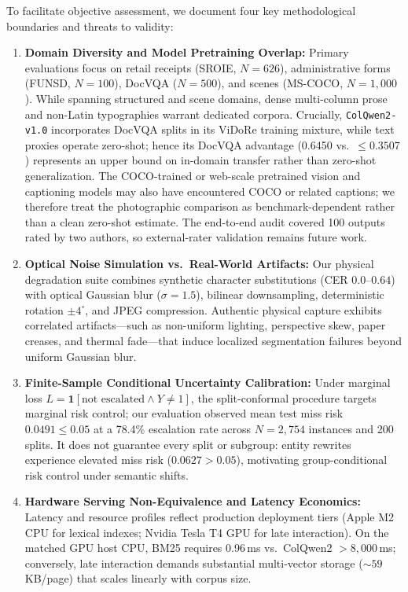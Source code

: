 To facilitate objective assessment, we document four key methodological boundaries and threats to validity:
\begin{enumerate}
    \setlength{\itemsep}{0.2pt plus 0.1pt}
    \setlength{\parskip}{0pt}
    \item \textbf{Domain Diversity and Model Pretraining Overlap:} Primary evaluations focus on retail receipts (SROIE, $N=626$), administrative forms (FUNSD, $N=100$), DocVQA ($N=500$), and scenes (MS-COCO, $N=1{,}000$). While spanning structured and scene domains, dense multi-column prose and non-Latin typographies warrant dedicated corpora. Crucially, \texttt{ColQwen2-v1.0} \cite{faysse2024colqwen2} incorporates DocVQA splits in its ViDoRe training mixture, while text proxies operate zero-shot; hence its DocVQA advantage (0.6450 vs.\ $\le 0.3507$) represents an upper bound on in-domain transfer rather than zero-shot generalization. The COCO-trained or web-scale pretrained vision and captioning models may also have encountered COCO or related captions; we therefore treat the photographic comparison as benchmark-dependent rather than a clean zero-shot estimate. The end-to-end audit covered 100 outputs rated by two authors, so external-rater validation remains future work.
    \item \textbf{Optical Noise Simulation vs.\ Real-World Artifacts:} Our physical degradation suite combines synthetic character substitutions (CER $0.0$--$0.64$) with optical Gaussian blur ($\sigma=1.5$), bilinear downsampling, deterministic rotation $\pm4^\circ$, and JPEG compression. Authentic physical capture exhibits correlated artifacts---such as non-uniform lighting, perspective skew, paper creases, and thermal fade---that induce localized segmentation failures beyond uniform Gaussian blur.
    \item \textbf{Finite-Sample Conditional Uncertainty Calibration:} Under marginal loss $L = \mathbf{1}[\text{not escalated} \land Y \ne 1]$, the split-conformal procedure targets marginal risk control; our evaluation observed mean test miss risk $0.0491 \le 0.05$ at a 78.4\% escalation rate across $N=2{,}754$ instances and 200 splits. It does not guarantee every split or subgroup: entity rewrites experience elevated miss risk ($0.0627 > 0.05$), motivating group-conditional risk control under semantic shifts.
    \item \textbf{Hardware Serving Non-Equivalence and Latency Economics:} Latency and resource profiles reflect production deployment tiers (Apple M2 CPU for lexical indexes; Nvidia Tesla T4 GPU for late interaction). On the matched GPU host CPU, BM25 requires 0.96\,ms vs.\ ColQwen2 $>8{,}000$\,ms; conversely, late interaction demands substantial multi-vector storage ($\sim 59$\,KB/page) that scales linearly with corpus size.
\end{enumerate}

